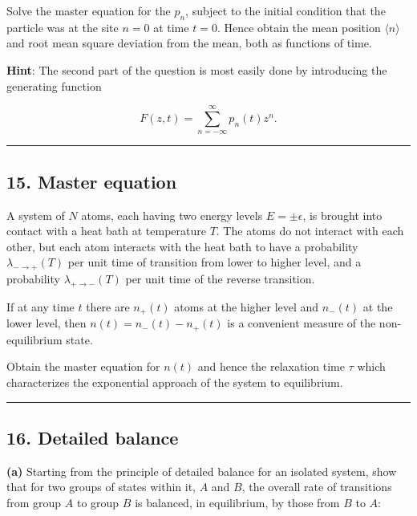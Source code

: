 \documentclass[
  letterpaper,
  enabledeprecatedfontcommands]{report}
\begin{document}
Solve the master equation for the \(p_n\), subject to the initial
condition that the particle was at the site \(n = 0\) at time \(t = 0\).
Hence obtain the mean position \(\langle n \rangle\) and root mean
square deviation from the mean, both as functions of time.

\textbf{Hint}: The second part of the question is most easily done by
introducing the generating function

\[
F(z, t) = \sum_{n=-\infty}^{\infty} p_n(t) z^n.
\]

\begin{center}\rule{0.5\linewidth}{0.5pt}\end{center}

\subsection*{15. Master equation}\label{master-equation}

A system of \(N\) atoms, each having two energy levels
\(E = \pm \epsilon\), is brought into contact with a heat bath at
temperature \(T\). The atoms do not interact with each other, but each
atom interacts with the heat bath to have a probability
\(\lambda_{-\to+}(T)\) per unit time of transition from lower to higher
level, and a probability \(\lambda_{+\to-}(T)\) per unit time of the
reverse transition.

If at any time \(t\) there are \(n_+(t)\) atoms at the higher level and
\(n_-(t)\) at the lower level, then \(n(t) = n_-(t) - n_+(t)\) is a
convenient measure of the non-equilibrium state.

Obtain the master equation for \(n(t)\) and hence the relaxation time
\(\tau\) which characterizes the exponential approach of the system to
equilibrium.

\begin{center}\rule{0.5\linewidth}{0.5pt}\end{center}

\subsection*{16. Detailed balance}\label{detailed-balance}

\textbf{(a)} Starting from the principle of detailed balance for an
isolated system, show that for two groups of states within it, \(A\) and
\(B\), the overall rate of transitions from group \(A\) to group \(B\)
is balanced, in equilibrium, by those from \(B\) to \(A\):
\end{document}
